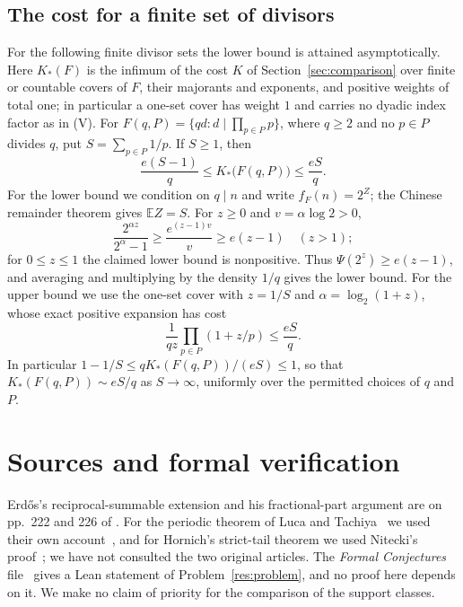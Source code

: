 \documentclass[11pt]{article}
\begin{document}
\subsection*{The cost for a finite set of divisors}
For the following finite divisor sets the lower bound is attained
asymptotically. Here $K_*(F)$ is the infimum of the cost $K$ of
Section~\ref{sec:comparison} over finite or countable covers of $F$,
their majorants and exponents, and positive weights of total one; in
particular a one-set cover has weight $1$ and carries no dyadic index
factor as in (V).
For $F(q,P)=\{qd:d\mid\prod_{p\in P}p\}$, where $q\ge2$ and no $p\in P$
divides $q$, put $S=\sum_{p\in P}1/p$.  If $S\ge1$, then
\begin{equation}
 \frac{e(S-1)}q\le K_*\bigl(F(q,P)\bigr)\le\frac{eS}q.
 \label{eq:optimal-cube-cost}
\end{equation}
For the lower bound we condition on $q\mid n$ and write $f_F(n)=2^Z$;
the Chinese remainder theorem gives $\mathbb EZ=S$. For $z\ge0$ and
$v=\alpha\log2>0$,
\[
 \frac{2^{\alpha z}}{2^\alpha-1}
 \ge\frac{e^{(z-1)v}}v\ge e(z-1)\quad(z>1);
\]
for $0\le z\le1$ the claimed lower bound is nonpositive.
Thus $\Psi(2^z)\ge e(z-1)$, and averaging and multiplying by the
density $1/q$ gives the lower bound. For the upper bound we use the
one-set cover with $z=1/S$ and $\alpha=\log_2(1+z)$, whose exact
positive expansion has cost
\[
 \frac1{qz}\prod_{p\in P}(1+z/p)\le\frac{eS}q.
\]
In particular $1-1/S\le qK_*(F(q,P))/(eS)\le1$, so that
$K_*(F(q,P))\sim eS/q$ as $S\to\infty$, uniformly over the permitted
choices of $q$ and $P$.

\section{Sources and formal verification}\label{app:sources}

Erd\H{o}s's reciprocal-summable extension and his fractional-part
argument are on pp.~222 and 226 of \cite{erdos1968}. For the periodic
theorem of Luca and Tachiya~\cite{lucatachiya2014periodic} we used
their own account~\cite[Theorem~A and Example~2, pp.~139--140]{lucatachiya2017},
and for Hornich's strict-tail theorem we used Nitecki's
proof~\cite[Theorem~4(1)]{nitecki2013}; we have not consulted the two
original articles. The \emph{Formal Conjectures}
file~\cite{formalconjectures257} gives a Lean statement of
Problem~\ref{res:problem}, and no proof here depends on it. We make no
claim of priority for the comparison of the support classes.
\end{document}
